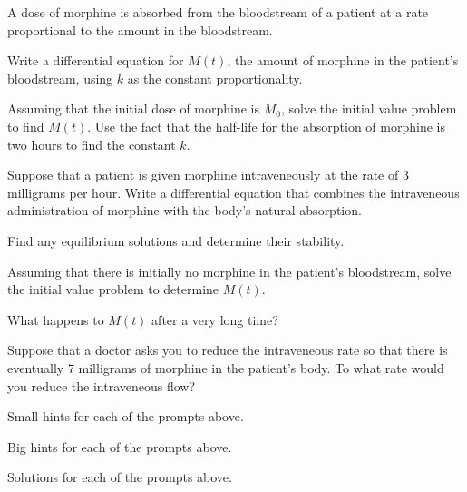 \begin{activity} \label{A:7.4.1}  
      \item A dose of morphine is 
        absorbed from the bloodstream of a patient at a rate
        proportional to the amount in the bloodstream.  

        \ba
        \item Write a differential equation for $M(t)$, the amount of
          morphine in the patient's bloodstream, using $k$ as the
          constant proportionality.
        \item 
          Assuming that the initial dose of morphine is $M_0$,
          solve the initial value problem to find $M(t)$.  Use the
          fact that the half-life for the absorption of morphine is
          two hours to find the constant $k$.
        \item Suppose that a patient is given morphine intraveneously
          at the rate of 3 milligrams per hour.  Write a differential
          equation that combines the intraveneous administration of
          morphine with the body's natural absorption.
        \item Find any equilibrium solutions and determine their
          stability. 
        \item Assuming that there is initially no morphine in the
          patient's bloodstream, solve the initial value problem to
          determine $M(t)$.
        \item What happens to $M(t)$ after a very long time?
        \item Suppose that a doctor asks you to reduce the
          intraveneous rate so that there is eventually 7 milligrams
          of morphine in the patient's body.  To what rate would you reduce
          the intraveneous flow?
        \ea





\ea
\end{activity}
\begin{smallhint}
\ba
	\item Small hints for each of the prompts above.
\ea
\end{smallhint}
\begin{bighint}
\ba
	\item Big hints for each of the prompts above.
\ea
\end{bighint}
\begin{activitySolution}
\ba
	\item Solutions for each of the prompts above.
\ea
\end{activitySolution}
\aftera